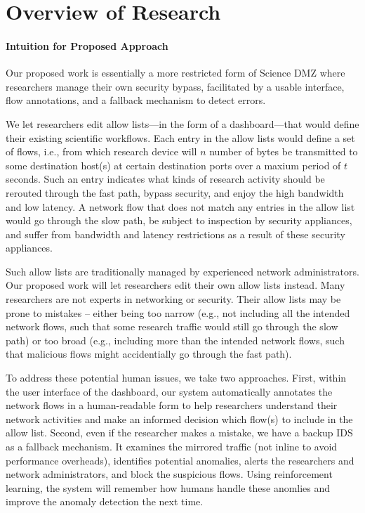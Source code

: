 \section{Overview of Research}

\paragraph{Intuition for Proposed Approach}
Our proposed work is essentially a more restricted form of Science DMZ where researchers manage their own security bypass, facilitated by a usable interface, flow annotations, and a fallback mechanism to detect errors.

We let researchers edit allow lists---in the form of a dashboard---that would define their existing scientific workflows. Each entry in the allow lists would define a set of flows, i.e., from which research device will $n$ number of bytes be transmitted to some destination host(s) at certain destination ports over a maxium period of $t$ seconds. Such an entry indicates what kinds of research activity should be rerouted through the fast path, bypass security, and enjoy the high bandwidth and low latency. A network flow that does not match any entries in the allow list would go through the slow path, be subject to inspection by security appliances, and suffer from bandwidth and latency restrictions as a result of these security appliances.

Such allow lists are traditionally managed by experienced network administrators. Our proposed work will let researchers edit their own allow lists instead. Many researchers are not experts in networking or security. Their allow lists may be prone to mistakes -- either being too narrow (e.g., not including all the intended network flows, such that some research traffic would still go through the slow path) or too broad (e.g., including more than the intended network flows, such that malicious flows might accidentially go through the fast path).

To address these potential human issues, we take two approaches. First, within the user interface of the dashboard, our system automatically annotates the network flows in a human-readable form to help researchers understand their network activities and make an informed decision which flow(s) to include in the allow list. Second, even if the researcher makes a mistake, we have a backup IDS as a fallback mechanism. It examines the mirrored traffic (not inline to avoid performance overheads), identifies potential anomalies, alerts the researchers and network administrators, and block the suspicious flows. Using reinforcement learning, the system will remember how humans handle these anomlies and improve the anomaly detection the next time.

